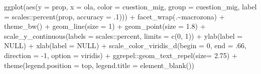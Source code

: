 \documentclass[
  12pt,
]{book}
\newenvironment{Shaded}{\begin{snugshade}}{\end{snugshade}}
\newcommand{\AttributeTok}[1]{\textcolor[rgb]{0.77,0.63,0.00}{#1}}
\newcommand{\ConstantTok}[1]{\textcolor[rgb]{0.00,0.00,0.00}{#1}}
\newcommand{\DecValTok}[1]{\textcolor[rgb]{0.00,0.00,0.81}{#1}}
\newcommand{\FloatTok}[1]{\textcolor[rgb]{0.00,0.00,0.81}{#1}}
\newcommand{\FunctionTok}[1]{\textcolor[rgb]{0.00,0.00,0.00}{#1}}
\newcommand{\NormalTok}[1]{#1}
\newcommand{\SpecialCharTok}[1]{\textcolor[rgb]{0.00,0.00,0.00}{#1}}
\newcommand{\StringTok}[1]{\textcolor[rgb]{0.31,0.60,0.02}{#1}}
\begin{document}
\begin{Shaded}
\begin{Highlighting}[]
  \FunctionTok{ggplot}\NormalTok{(}\FunctionTok{aes}\NormalTok{(}\AttributeTok{y =}\NormalTok{ prop, }\AttributeTok{x =}\NormalTok{ ola, }\AttributeTok{color =}\NormalTok{ cuestion\_mig, }\AttributeTok{group =}\NormalTok{ cuestion\_mig,}
             \AttributeTok{label =}\NormalTok{ scales}\SpecialCharTok{::}\FunctionTok{percent}\NormalTok{(prop, }\AttributeTok{accuracy =}\NormalTok{ .}\DecValTok{1}\NormalTok{))) }\SpecialCharTok{+}
  \FunctionTok{facet\_wrap}\NormalTok{(.}\SpecialCharTok{\textasciitilde{}}\NormalTok{macrozona) }\SpecialCharTok{+}
  \FunctionTok{theme\_bw}\NormalTok{() }\SpecialCharTok{+}   
  \FunctionTok{geom\_line}\NormalTok{(}\AttributeTok{size =} \DecValTok{1}\NormalTok{) }\SpecialCharTok{+}
  \FunctionTok{geom\_point}\NormalTok{(}\AttributeTok{size =} \FloatTok{1.8}\NormalTok{) }\SpecialCharTok{+}
  \FunctionTok{scale\_y\_continuous}\NormalTok{(}\AttributeTok{labels =}\NormalTok{ scales}\SpecialCharTok{::}\NormalTok{percent,}
                     \AttributeTok{limits =} \FunctionTok{c}\NormalTok{(}\DecValTok{0}\NormalTok{, }\DecValTok{1}\NormalTok{)) }\SpecialCharTok{+}
  \FunctionTok{ylab}\NormalTok{(}\AttributeTok{label =} \ConstantTok{NULL}\NormalTok{) }\SpecialCharTok{+}
  \FunctionTok{xlab}\NormalTok{(}\AttributeTok{label =} \ConstantTok{NULL}\NormalTok{) }\SpecialCharTok{+}
  \FunctionTok{scale\_color\_viridis\_d}\NormalTok{(}\AttributeTok{begin =} \DecValTok{0}\NormalTok{, }\AttributeTok{end =}\NormalTok{ .}\DecValTok{66}\NormalTok{, }\AttributeTok{direction =} \SpecialCharTok{{-}}\DecValTok{1}\NormalTok{, }\AttributeTok{option =} \StringTok{\textquotesingle{}viridis\textquotesingle{}}\NormalTok{) }\SpecialCharTok{+}
\NormalTok{  ggrepel}\SpecialCharTok{::}\FunctionTok{geom\_text\_repel}\NormalTok{(}\AttributeTok{size=} \FloatTok{2.75}\NormalTok{) }\SpecialCharTok{+}
  \FunctionTok{theme}\NormalTok{(}\AttributeTok{legend.position =} \StringTok{\textquotesingle{}top\textquotesingle{}}\NormalTok{,}
        \AttributeTok{legend.title =} \FunctionTok{element\_blank}\NormalTok{())}
\end{Highlighting}
\end{Shaded}
\end{document}
